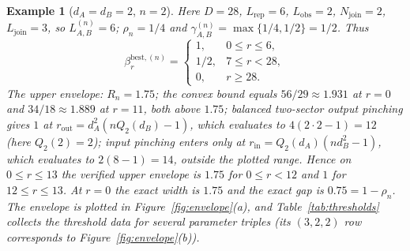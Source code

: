 \documentclass[11pt,a4paper]{article}
\newtheorem{example}[theorem]{Example}
\begin{document}
\begin{example}[$d_A=d_B=2$, $n=2$]
\label{ex:222}
Here $D=28$, $L_{\mathrm{rep}}=6$, $L_{\mathrm{obs}}=2$, $N_{\mathrm{join}}=2$, $L_{\mathrm{join}}=3$, so $L_{A,B}^{(n)}=6$; $\rho_n=1/4$ and $\gamma_{A,B}^{(n)}=\max\{1/4,1/2\}=1/2$. Thus
\[
\beta_r^{\mathrm{best},(n)}=
\begin{cases}
1,&0\le r\le6,\\
1/2,&7\le r<28,\\
0,&r\ge28.
\end{cases}
\]
The upper envelope: $R_n=1.75$; the convex bound equals $56/29\approx1.931$ at $r=0$ and $34/18\approx1.889$ at $r=11$, both above $1.75$; balanced two-sector output pinching gives $1$ at $r_{\mathrm{out}}=d_A^2(nQ_2(d_B)-1)$, which evaluates to $4(2\cdot2-1)=12$ (here $Q_2(2)=2$); input pinching enters only at $r_{\mathrm{in}}=Q_2(d_A)(nd_B^2-1)$, which evaluates to $2(8-1)=14$, outside the plotted range. Hence on $0\le r\le13$ the verified upper envelope is $1.75$ for $0\le r<12$ and $1$ for $12\le r\le13$. At $r=0$ the exact width is $1.75$ and the exact gap is $0.75=1-\rho_n$. The envelope is plotted in Figure~\ref{fig:envelope}(a), and Table~\ref{tab:thresholds} collects the threshold data for several parameter triples (its $(3,2,2)$ row corresponds to Figure~\ref{fig:envelope}(b)).
\end{example}
\end{document}
